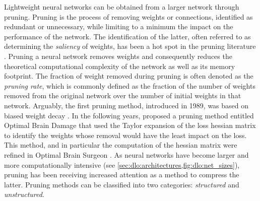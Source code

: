 Lightweight neural networks can be obtained from a larger network through
pruning. Pruning is the process of removing weights or connections, identified
as redundant or unnecessary, while limiting to a minimum the impact on the
performance of the network. The identification of the latter, often referred to
as determining the \emph{saliency} of weights, has been a hot spot in the
pruning literature \cite{li2023model,cheng2017survey,liang2021pruning}. Pruning
a neural network removes weights and consequently reduces the theoretical
computational complexity of the network as well as its memory footprint.  The
fraction of weight removed during pruning is often denoted as the \emph{pruning
  rate}, which is commonly defined as the fraction of the number of weights
removed from the original network over the number of initial weights in that
network. Arguably, the first pruning method, introduced in 1989, was based on
biased weight decay \cite{hanson1988comparing}. In the following years,
\citeauthor{DBLP:conf/nips/CunDS89} proposed a pruning method entitled Optimal
Brain Damage \cite{DBLP:conf/nips/CunDS89} that used the Taylor expansion of the
loss hessian matrix to identify the weights whose removal would have the least
impact on the loss. This method, and in particular the computation of the
hessian matrix were refined in Optimal Brain Surgeon
\cite{DBLP:conf/nips/HassibiS92,DBLP:conf/nips/HassibiSW93,DBLP:conf/icnn/HassibiSW93}.
As neural networks have become larger and more computationally intensive (see
\cref{sec:dlo:architectures,fig:dlo:net_sizes}), pruning has been receiving
increased attention as a method to compress the latter. Pruning methods can be
classified into two categories: \emph{structured} and \emph{unstructured}.\\


